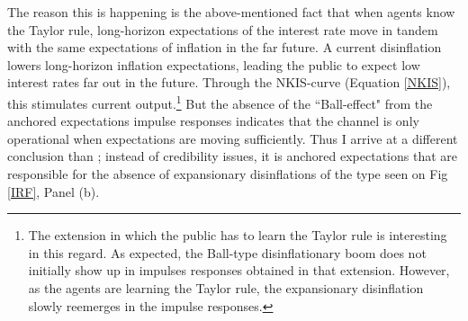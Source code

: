 \documentclass[11pt]{article}
\renewcommand{\[}{\begin{equation}}
\renewcommand{\]}{\end{equation}}
\begin{document}
The reason this is happening is the above-mentioned fact that when agents know the Taylor rule, long-horizon expectations of the interest rate move in tandem with the same expectations of inflation in the far future. A current disinflation lowers long-horizon inflation expectations, leading the public to expect low interest rates far out in the future. Through the NKIS-curve (Equation \ref{NKIS}), this stimulates current output.\footnote{The extension in which the public has to learn the Taylor rule is interesting in this regard. As expected, the Ball-type disinflationary boom does not initially show up in impulses responses obtained in that extension. However, as the agents are learning the Taylor rule, the expansionary disinflation slowly reemerges in the impulse responses.} But the absence of the ``Ball-effect" from the anchored expectations impulse responses indicates that the channel is only operational when expectations are moving sufficiently. Thus I arrive at a different conclusion than \cite{ball1994credible}; instead of credibility issues, it is anchored expectations that are responsible for the absence of expansionary disinflations of the type seen on Fig \ref{IRF}, Panel (b).
\end{document}
